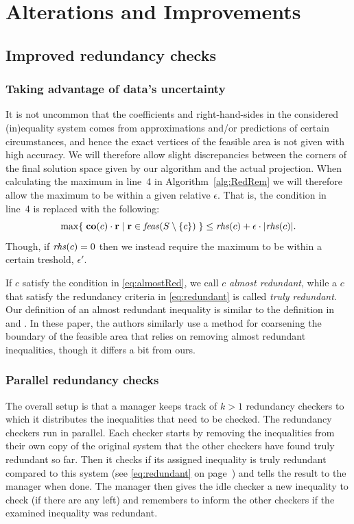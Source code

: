 \section{Alterations and Improvements}\label{sec:improvements}
\subsection{Improved redundancy checks}
\subsubsection{Taking advantage of data's uncertainty}\label{sec:uncertainty} 
It is not uncommon that the coefficients and right-hand-sides in the considered (in)equality system comes from approximations and/or predictions of certain circumstances, and hence the exact vertices of the feasible area is not given with high accuracy. We will therefore allow slight discrepancies between the corners of the final solution space given by our algorithm and the actual projection. 
When calculating the maximum in line~4 in Algorithm~\ref{alg:RedRem} we will therefore allow the maximum to be within a given relative $\epsilon$. That is, the condition in line~4 is replaced with the following:
\begin{equation}\label{eq:almostRed}
\max\{\;{\mathbf{co}(c)\cdot\mathbf{r}}\;|\;{\mathbf{r}\in \mathit{feas}(S\setminus\{c\})}\;\}\leq \mathit{rhs}(c) + \epsilon\cdot |\mathit{rhs}(c)|.
\end{equation}
Though, if $\mathit{rhs}(c)=0$ then we instead require the maximum to be within a certain treshold, $\epsilon'$. 

If $c$ satisfy the condition in \eqref{eq:almostRed}, we call $c$ \emph{almost redundant}, while a $c$ that satisfy the redundancy criteria in \eqref{eq:redundant} is called \emph{truly redundant}. Our definition of an almost redundant inequality is similar to the definition in \cite{lukatskii08} and \cite{shapot12}. In these paper, the authors similarly use a method for coarsening the boundary of the feasible area that relies on removing almost redundant inequalities, though it differs a bit from ours.  

\subsubsection{Parallel redundancy checks}
The overall setup is that a manager keeps track of $k>1$ redundancy checkers to which it distributes the inequalities that need to be checked. The redundancy checkers run in parallel. Each checker starts by removing the inequalities from their own copy of the original system that the other checkers have found truly redundant so far. Then it checks if its assigned inequality is truly redundant compared to this system (see \eqref{eq:redundant} on page~\pageref{eq:redundant}) and tells the result to the manager when done. The manager then gives the idle checker a new inequality to check (if there are any left) and remembers to inform the other checkers if the examined inequality was redundant.

